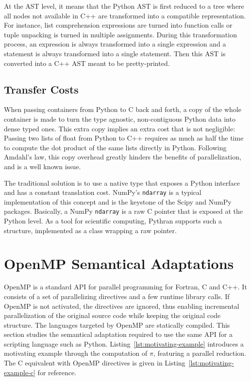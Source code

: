 \documentclass[conference]{IEEEtran}
\begin{document}
At the AST level, it means that the Python AST is first reduced to a tree where
all nodes not available in C++ are transformed into a compatible representation.
For instance, list comprehension expressions are turned into function calls or
tuple unpacking is turned in multiple assignments. During this transformation
process, an expression is always transformed into a single expression and a
statement is always transformed into a single statement. Then this AST is
converted into a C++ AST meant to be pretty-printed.


\subsection{Transfer Costs}

When passing containers from Python to C back and forth, a copy of the whole
container is made to turn the type agnostic, non-contiguous Python data into
dense typed ones. This extra copy implies an extra cost that is not negligible:
Passing two lists of float from Python to C++ requires as much as half the time
to compute the dot product of the same lists directly in Python. Following
Amdahl's law, this copy overhead greatly hinders the benefits of
parallelization, and is a well known issue.

The traditional solution is to use a native type that exposes a Python interface
and has a constant translation cost. NumPy's \texttt{ndarray} is a typical
implementation of this concept and is the keystone of the Scipy and NumPy
packages. Basically, a NumPy \texttt{ndarray} is a raw C pointer that is exposed
at the Python level. As a tool for scientific computing, Pythran supports such a
structure, implemented as a class wrapping a raw pointer.


\section{OpenMP Semantical Adaptations}\label{sec:python-openmp}

OpenMP is a standard API for parallel programming for Fortran, C and C++. It
consists of a set of parallelizing directives and a few runtime library calls.
If OpenMP is not activated, the directives are ignored, thus enabling
incremental parallelization of the original source code while keeping the
original code structure. The languages targeted by OpenMP are statically
compiled. This section studies the semantical adaptation required to use the
same API for a scripting language such as Python.
Listing~\ref{lst:motivating-example} introduces a motivating example through the
computation of $\pi$, featuring a parallel reduction. The C equivalent with
OpenMP directives is given in Listing~\ref{lst:motivating-example-c} for
reference.
\end{document}
